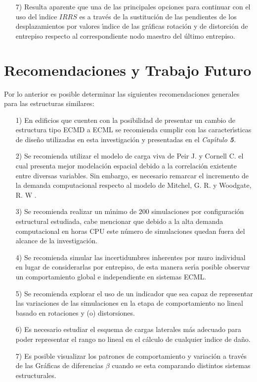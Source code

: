 \begin{itemize}
		\newpage
		
	\item [7)] Resulta aparente que una de las principales opciones para continuar con el uso del \'{\i}ndice $IRRS$ es a trav\'es de la sustituci\'on de las pendientes de los desplazamientos por valores \'{\i}ndice de las gr\'aficas rotaci\'on y de distorci\'on de entrepiso respecto al correspondiente nodo maestro del \'ultimo entrepiso. 		
\end{itemize}

\section{Recomendaciones y Trabajo Futuro}

Por lo anterior es posible determinar las siguientes recomendaciones generales para las estructuras similares:

\begin{itemize}
	\item [1)] En edificios que cuenten con la posibilidad de presentar un cambio de estructura tipo ECMD a ECML se recomienda cumplir con las caracter\'{\i}sticas de dise\~no utilizadas en esta investigaci\'on y presentadas en el \emph{Cap\'{\i}tulo \textbf{5}}. 
	\item [2)] Se recomienda utilizar el modelo de carga viva de Peir J. y Cornell C. \cite{PC1973} el cual presenta mejor modelaci\'on espacial debido a la correlaci\'on existente entre diversas variables. Sin embargo, es necesario remarcar el incremento de la demanda computacional respecto al modelo de Mitchel, G. R. y Woodgate, R. W \cite{MG1970}.
		\item [3)] Se recomienda realizar un m\'{\i}nimo de $200$ simulaciones por configuraci\'on estructural estudiada, cabe mencionar que debido a la alta  demanda computacional en horas CPU este n\'umero de simulaciones quedan fuera del alcance de la investigaci\'on.
		\item [4)] Se recomienda simular las incertidumbres inherentes por muro individual en lugar de considerarlas por entrepiso, de esta manera ser\'{\i}a posible observar un comportamiento global e independiente en sistemas ECML.
	\item [5)] Se recomienda explorar el uso de un indicador que sea capaz de representar las variaciones de las simulaciones en la etapa de comportamiento no lineal basado en rotaciones y (o) distorsiones.	
		\item [6)] Es necesario estudiar el esquema de cargas laterales m\'as adecuado para poder representar el rango no lineal en el c\'alculo de cualquier \'{\i}ndice de da\~no.
		\item [7)] Es posible visualizar los patrones de comportamiento y variaci\'on a trav\'es de las Gr\'aficas de diferencias $\beta$ cuando se esta comparando distintos sistemas estructurales.
\end{itemize}

